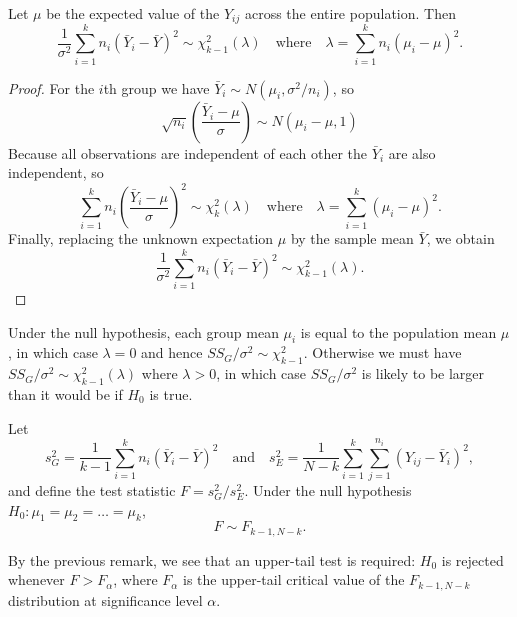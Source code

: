 \begin{lemma}\label{lem:ssg}
Let $\mu$ be the expected value of the $Y_{ij}$ across the entire population. Then
\[
\frac{1}{\sigma^2}\sum_{i=1}^k n_i (\bar{Y}_i - \bar{Y})^2 \sim \chi^2_{k-1}(\lambda)
\quad\text{where}\quad\lambda = \sum_{i=1}^k n_i(\mu_i-\mu)^2.
\]
\end{lemma}

\begin{proof}
For the $i$th group we have $\bar{Y}_i \sim N(\mu_i,\sigma^2/n_i)$, so
\[ 
\sqrt{n_i}\left(\frac{\bar{Y}_i - \mu}{\sigma}\right) \sim N(\mu_i-\mu,1)
\]
Because all observations are independent of each other the $\bar{Y}_i$ are also independent, so
\[
\sum_{i=1}^k n_i\left(\frac{\bar{Y}_i - \mu}{\sigma}\right)^2 \sim \chi^2_{k}(\lambda) 
\quad\text{where}\quad \lambda = \sum_{i=1}^k(\mu_i-\mu)^2.
\]
Finally, replacing the unknown expectation $\mu$ by the sample mean $\bar{Y}$, we obtain 
\[
\frac{1}{\sigma^2}\sum_{i=1}^k n_i (\bar{Y}_i - \bar{Y})^2 \sim \chi^2_{k-1}(\lambda).
\]
\end{proof}

\begin{remark}
Under the null hypothesis, each group mean $\mu_i$ is equal to the population mean $\mu$, in which case $\lambda=0$ and hence $SS_G/\sigma^2 \sim \chi^2_{k-1}$. Otherwise we must have $SS_G/\sigma^2 \sim \chi^2_{k-1}(\lambda)$ where $\lambda>0$, in which case $SS_G/\sigma^2$ is likely to be larger than it would be if $H_0$ is true.
\end{remark}

\begin{theorem}
Let
\[
s^2_G = \frac{1}{k-1}\sum_{i=1}^k n_i (\bar{Y}_i-\bar{Y})^2
\quad\text{and}\quad
s^2_E = \frac{1}{N-k}\sum_{i=1}^k\sum_{j=1}^{n_i} (Y_{ij}-\bar{Y}_i)^2,
\]
and define the test statistic $F = s^2_G/s^2_E$. Under the null hypothesis $H_0:\mu_1=\mu_2=\ldots=\mu_k$, %
\[
F \sim F_{k-1,N-k}.
\]
\end{theorem}

\begin{remark}
By the previous remark, we see that an upper-tail test is required: $H_0$ is rejected whenever $F > F_{\alpha}$, where $F_{\alpha}$ is the upper-tail critical value of the $F_{k-1,N-k}$ distribution at significance level $\alpha$. 
\end{remark}

